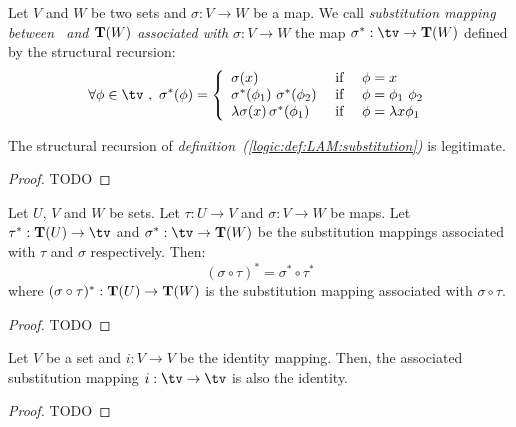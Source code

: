 \begin{defin}\label{logic:def:LAM:substitution}
    Let $V$ and $W$ be two sets and $\sigma:V\to W$ be a map. We call
    {\em substitution mapping between \tv\ and ${\bf T}(W)$ associated
    with $\sigma:V\to W$} the map $\sigma^{*}:\tv\to{\bf T}(W)$ defined
    by the structural recursion:
    \begin{equation}\label{logic:eqn:LAM:substitution:recursion}
        \forall\phi\in\tv\ ,\ \sigma^{*}(\phi)=\left\{
            \begin{array}{lcl}
                \sigma(x)
                    &\mbox{\ if\ }&
                \phi=x
                \\
                \sigma^{*}(\phi_{1})\ \sigma^{*}(\phi_{2}) 
                    &\mbox{\ if\ }&
                \phi=\phi_{1}\ \phi_{2}
                \\
                \lambda\sigma(x)\,\sigma^{*}(\phi_{1})
                    &\mbox{\ if\ }&
                \phi=\lambda x\phi_{1}
            \end{array}\right.
    \end{equation}
\end{defin}

\begin{prop}\label{logic:prop:LAM:substitution}
    The structural recursion of 
    {\em definition~(\ref{logic:def:LAM:substitution})} 
    is legitimate.
\end{prop}
\begin{proof}
    TODO
\end{proof}

\begin{prop}\label{logic:prop:LAM:substitution:composition}
    Let $U$, $V$ and $W$ be sets. Let $\tau:U\to V$ and $\sigma:V\to W$
    be maps. Let $\tau^{*}:{\bf T}(U)\to\tv$ and $\sigma^{*}:\tv\to{\bf
    T}(W)$ be the substitution mappings associated with $\tau$ and
    $\sigma$ respectively. Then:
    \[
        (\sigma\circ\tau)^{*}
        =
        \sigma^{*}\circ\tau^{*}
    \]
    where $(\sigma\circ\tau)^{*}:{\bf T}(U)\to {\bf T}(W)$ is the
    substitution mapping associated with $\sigma\circ\tau$.
\end{prop}
\begin{proof}
    TODO
\end{proof}

\begin{prop}\label{logic:prop:LAM:substitution:identity}
    Let $V$ be a set and $i:V\to V$ be the identity mapping. Then, the
    associated substitution mapping $i:\tv\to\tv$ is also the identity.
\end{prop}
\begin{proof}
    TODO
\end{proof}

